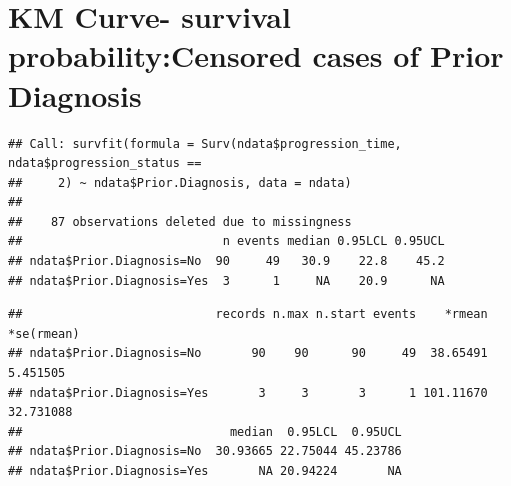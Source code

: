 \documentclass[
  11pt,
]{article}
\newenvironment{Shaded}{\begin{snugshade}}{\end{snugshade}}
\newcommand{\AttributeTok}[1]{\textcolor[rgb]{0.77,0.63,0.00}{#1}}
\newcommand{\DecValTok}[1]{\textcolor[rgb]{0.00,0.00,0.81}{#1}}
\newcommand{\FunctionTok}[1]{\textcolor[rgb]{0.00,0.00,0.00}{#1}}
\newcommand{\NormalTok}[1]{#1}
\newcommand{\OtherTok}[1]{\textcolor[rgb]{0.56,0.35,0.01}{#1}}
\newcommand{\SpecialCharTok}[1]{\textcolor[rgb]{0.00,0.00,0.00}{#1}}
\newcommand{\StringTok}[1]{\textcolor[rgb]{0.31,0.60,0.02}{#1}}
\begin{document}
\newpage
\section{KM Curve- survival probability:Censored cases of Prior Diagnosis}

\begin{Shaded}
\end{Shaded}

\begin{verbatim}
## Call: survfit(formula = Surv(ndata$progression_time, ndata$progression_status == 
##     2) ~ ndata$Prior.Diagnosis, data = ndata)
## 
##    87 observations deleted due to missingness 
##                            n events median 0.95LCL 0.95UCL
## ndata$Prior.Diagnosis=No  90     49   30.9    22.8    45.2
## ndata$Prior.Diagnosis=Yes  3      1     NA    20.9      NA
\end{verbatim}

\begin{Shaded}
\end{Shaded}

\begin{verbatim}
##                           records n.max n.start events    *rmean *se(rmean)
## ndata$Prior.Diagnosis=No       90    90      90     49  38.65491   5.451505
## ndata$Prior.Diagnosis=Yes       3     3       3      1 101.11670  32.731088
##                             median  0.95LCL  0.95UCL
## ndata$Prior.Diagnosis=No  30.93665 22.75044 45.23786
## ndata$Prior.Diagnosis=Yes       NA 20.94224       NA
\end{verbatim}
\end{document}
